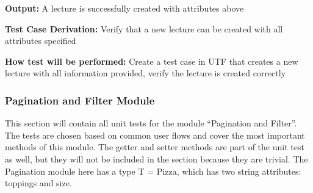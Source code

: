 \documentclass[12pt, titlepage]{article}
\begin{document}
\begin{enumerate}
\textbf{Output:} A lecture is successfully created with attributes above

\textbf{Test Case Derivation:} Verify that a new lecture can be created with all attributes specified

\textbf{How test will be performed:} Create a test case in UTF that creates a new lecture with all information provided, verify the lecture is created correctly
\end{enumerate}

\subsubsection{Pagination and Filter Module}

This section will contain all unit tests for the module ``Pagination and Filter''. The tests are chosen based on common user flows and cover the most important methods of this module. The getter and setter methods are part of the unit test as well, but they will not be included in the section because they are trivial. The Pagination module here has a type T = Pizza, which has two string attributes: toppings and size.
\end{document}
